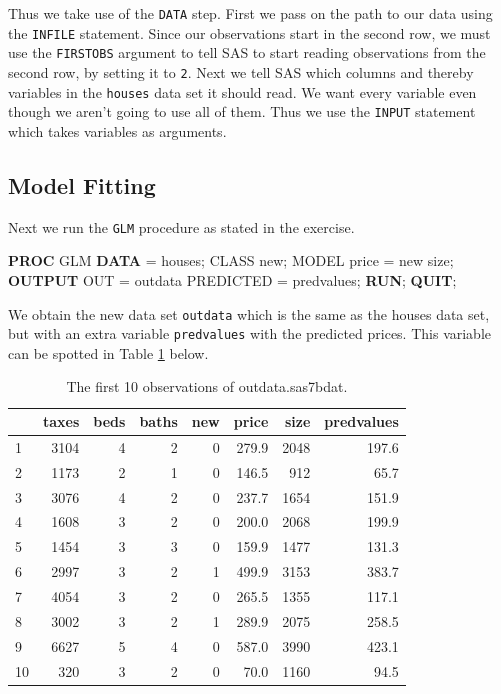 \documentclass[a4paper,oneside]{memoir}
\newenvironment{Shaded}{\begin{snugshade}}{\end{snugshade}}
\newcommand{\KeywordTok}[1]{\textcolor[rgb]{0.13,0.29,0.53}{\textbf{#1}}}
\newcommand{\NormalTok}[1]{#1}
\begin{document}
Thus we take use of the \texttt{DATA} step. First we pass on the path to our data using the \texttt{INFILE} statement. Since our observations start in the second row, we must use the \texttt{FIRSTOBS} argument to tell SAS to start reading observations from the second row, by setting it to \texttt{2}. Next we tell SAS which columns and thereby variables in the \texttt{houses} data set it should read. We want every variable even though we aren't going to use all of them. Thus we use the \texttt{INPUT} statement which takes variables as arguments. \citep{DATAStep}

\hypertarget{model-fitting}{%
\subsection{Model Fitting}\label{model-fitting}}

Next we run the \texttt{GLM} procedure as stated in the exercise.

\begin{Shaded}
\begin{Highlighting}[]
\KeywordTok{PROC}\NormalTok{ GLM}\KeywordTok{ DATA}\NormalTok{ = houses;}
\NormalTok{CLASS new;}
\NormalTok{MODEL price = new size;}
\KeywordTok{OUTPUT}\NormalTok{ OUT = outdata PREDICTED = predvalues;}
\KeywordTok{RUN}\NormalTok{;}
\KeywordTok{QUIT}\NormalTok{;}
\end{Highlighting}
\end{Shaded}

We obtain the new data set \texttt{outdata} which is the same as the houses data set, but with an extra variable \texttt{predvalues} with the predicted prices. This variable can be spotted in Table \ref{tab:outdata} below.

\begin{table}[!h]

\caption{\label{tab:outdata}The first 10 observations of outdata.sas7bdat.}
\centering
\begin{tabular}{lrrrrrrr}
\toprule
  & taxes & beds & baths & new & price & size & predvalues\\
\midrule
\rowcolor{gray!6}  1 & 3104 & 4 & 2 & 0 & 279.9 & 2048 & 197.6\\
2 & 1173 & 2 & 1 & 0 & 146.5 & 912 & 65.7\\
\rowcolor{gray!6}  3 & 3076 & 4 & 2 & 0 & 237.7 & 1654 & 151.9\\
4 & 1608 & 3 & 2 & 0 & 200.0 & 2068 & 199.9\\
\rowcolor{gray!6}  5 & 1454 & 3 & 3 & 0 & 159.9 & 1477 & 131.3\\
6 & 2997 & 3 & 2 & 1 & 499.9 & 3153 & 383.7\\
\rowcolor{gray!6}  7 & 4054 & 3 & 2 & 0 & 265.5 & 1355 & 117.1\\
8 & 3002 & 3 & 2 & 1 & 289.9 & 2075 & 258.5\\
\rowcolor{gray!6}  9 & 6627 & 5 & 4 & 0 & 587.0 & 3990 & 423.1\\
10 & 320 & 3 & 2 & 0 & 70.0 & 1160 & 94.5\\
\bottomrule
\end{tabular}
\end{table}
\end{document}
